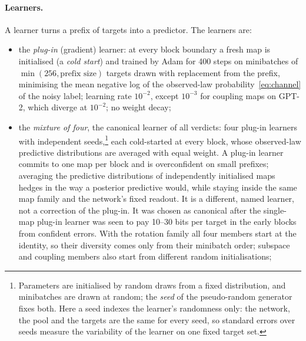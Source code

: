 \documentclass[11pt,a4paper]{article}
\begin{document}
\paragraph{Learners.} A learner turns a prefix of targets into a predictor. The learners are:
\begin{itemize}
\item the \emph{plug-in} (gradient) learner: at every block boundary a fresh map is initialised (a \emph{cold start}) and trained by Adam for 400 steps on minibatches of $\min(256,\text{prefix size})$ targets drawn with replacement from the prefix, minimising the mean negative log of the observed-law probability~\eqref{eq:channel} of the noisy label; learning rate $10^{-2}$, except $10^{-3}$ for coupling maps on GPT-2, which diverge at $10^{-2}$; no weight decay;
\item the \emph{mixture of four}, the canonical learner of all verdicts: four plug-in learners with independent seeds,\footnote{Parameters are initialised by random draws from a fixed distribution, and minibatches are drawn at random; the \emph{seed} of the pseudo-random generator fixes both. Here a seed indexes the learner's randomness only: the network, the pool and the targets are the same for every seed, so standard errors over seeds measure the variability of the learner on one fixed target set.} each cold-started at every block, whose observed-law predictive distributions are averaged with equal weight. A plug-in learner commits to one map per block and is overconfident on small prefixes; averaging the predictive distributions of independently initialised maps hedges in the way a posterior predictive would, while staying inside the same map family and the network's fixed readout. It is a different, named learner, not a correction of the plug-in. It was chosen as canonical after the single-map plug-in learner was seen to pay 10--30 bits per target in the early blocks from confident errors. With the rotation family all four members start at the identity, so their diversity comes only from their minibatch order; subspace and coupling members also start from different random initialisations;

\end{itemize}
\end{document}
